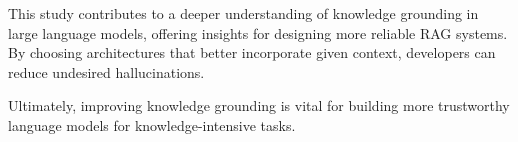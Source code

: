 % 
% 

This study contributes to a deeper understanding of knowledge grounding in large language models, offering insights for designing more reliable RAG systems.
By choosing architectures that better incorporate given context, developers can reduce undesired hallucinations.

Ultimately, improving knowledge grounding is vital for building more trustworthy language models for knowledge-intensive tasks.
